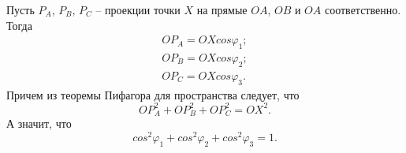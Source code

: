 Пусть $P_A$, $P_B$, $P_C$ -- проекции точки $X$ на прямые $OA$, $OB$ и $OA$ соответственно. Тогда
\begin{align*}
OP_A=OXcos{\varphi_1}; \\
OP_B=OXcos{\varphi_2}; \\
OP_C=OXcos{\varphi_3}.
\end{align*}
Причем из теоремы Пифагора для пространства следует, что
\begin{equation}
OP_A^2+OP_B^2+OP_C^2=OX^2.
\end{equation}
А значит, что
\begin{equation}
cos^2\varphi_1 + cos^2\varphi_2 + cos^2\varphi_3 = 1.
\end{equation}
